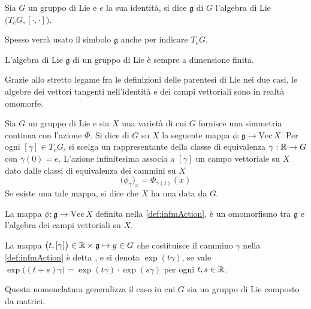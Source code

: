 \begin{definition}
  Sia $G$ un gruppo di Lie e $e$ la sua identità, si dice  $\mathfrak{g}$ di $G$ l'algebra di Lie $\big(T_e G, [\cdot ,\cdot ]\big)$.
\end{definition}
\begin{remark}
  Spesso verrà usato il simbolo $\mathfrak{g}$ anche per indicare $T_e G$.
\end{remark}
\begin{theorem}
  L'algebra di Lie $\mathfrak{g}$ di un gruppo di Lie è sempre a dimensione finita.
\end{theorem}

Grazie allo stretto legame fra le definizioni delle parentesi di Lie nei due casi, le algebre dei vettori tangenti nell'identità e dei campi vettoriali sono in realtà omomorfe.

\begin{definition} \label{def:infmAction}
  Sia $G$ un gruppo di Lie e sia $X$ una varietà di cui $G$ fornisce una simmetria continua con l'azione $\Phi$. Si dice  di $G$ su $X$ la seguente mappa $\phi: \mathfrak{g} \to \mathrm{Vec}\, X$. Per ogni $[\gamma] \in T_e G$, si scelga un rappresentante della classe di equivalenza $\gamma:\mathbb{R}\to G$ con $\gamma(0) = e$. L'azione infinitesima associa a $[\gamma]$ un campo vettoriale su $X$ dato dalle classi di equivalenza dei cammini su $X$
  \begin{equation*}
  \big(\phi_{\gamma}\big)_x = \Phi_{\gamma(t)} (x)
  \end{equation*}
  Se esiste una tale mappa, si dice che $X$ ha una  data da $G$.
\end{definition}
\begin{theorem}
  La mappa $\phi: \mathfrak{g} \to \mathrm{Vec}\, X$ definita nella \autoref{def:infmAction}, è un omomorfismo tra $\mathfrak{g}$ e l'algebra dei campi vettoriali su $X$.
\end{theorem}
\begin{definition}
  La mappa $\big(t, [\gamma]\big) \in \mathbb{R} \times  \mathfrak{g} \mapsto g \in G$ che costituisce il cammino $\gamma$ nella \autoref{def:infmAction} è detta , e si denota $\exp(t \gamma)$, se vale $\exp\big((t+s) \gamma\big) = \exp(t \gamma) \cdot  \exp (s \gamma)$ per ogni $t,s \in \mathbb{R}$.
\end{definition}
\begin{remark}
  Questa nomenclatura generalizza il caso in cui $G$ sia un gruppo di Lie composto da matrici.
\end{remark}

